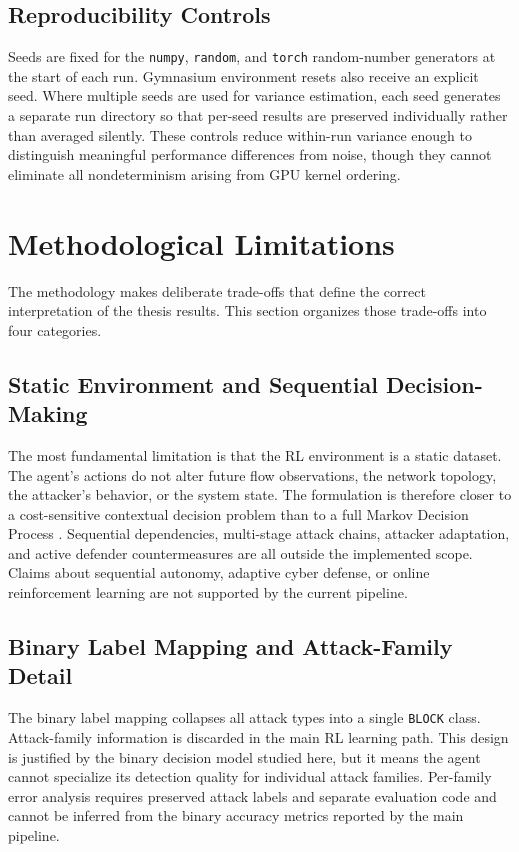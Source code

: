 \subsection{Reproducibility Controls}
Seeds are fixed for the \texttt{numpy}, \texttt{random}, and \texttt{torch} random-number generators at the start of each run. Gymnasium environment resets also receive an explicit seed. Where multiple seeds are used for variance estimation, each seed generates a separate run directory so that per-seed results are preserved individually rather than averaged silently. These controls reduce within-run variance enough to distinguish meaningful performance differences from noise, though they cannot eliminate all nondeterminism arising from GPU kernel ordering.

\section{Methodological Limitations}
The methodology makes deliberate trade-offs that define the correct interpretation of the thesis results. This section organizes those trade-offs into four categories.

\subsection{Static Environment and Sequential Decision-Making}
The most fundamental limitation is that the RL environment is a static dataset. The agent's actions do not alter future flow observations, the network topology, the attacker's behavior, or the system state. The formulation is therefore closer to a cost-sensitive contextual decision problem than to a full Markov Decision Process \parencite{SuttonBarto2018RL,Levine2020OfflineRL}. Sequential dependencies, multi-stage attack chains, attacker adaptation, and active defender countermeasures are all outside the implemented scope. Claims about sequential autonomy, adaptive cyber defense, or online reinforcement learning are not supported by the current pipeline.

\subsection{Binary Label Mapping and Attack-Family Detail}
The binary label mapping collapses all attack types into a single \texttt{BLOCK} class. Attack-family information is discarded in the main RL learning path. This design is justified by the binary decision model studied here, but it means the agent cannot specialize its detection quality for individual attack families. Per-family error analysis requires preserved attack labels and separate evaluation code and cannot be inferred from the binary accuracy metrics reported by the main pipeline.

